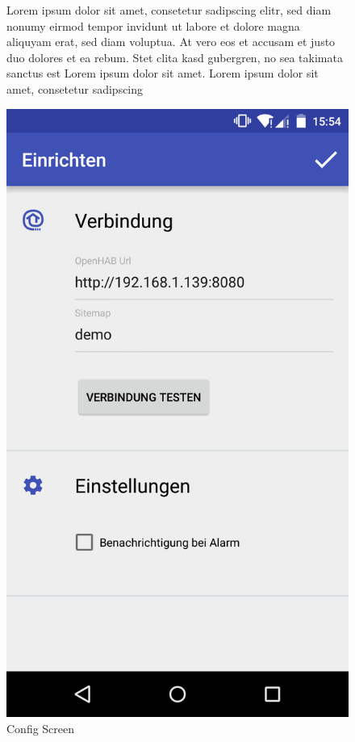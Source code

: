 \begin{figure}[htbp]
	\begin{minipage}{0.6\textwidth} 
Lorem ipsum dolor sit amet, consetetur sadipscing elitr, sed diam nonumy eirmod tempor invidunt ut labore et dolore magna aliquyam erat, sed diam voluptua. At vero eos et accusam et justo duo dolores et ea rebum. Stet clita kasd gubergren, no sea takimata sanctus est Lorem ipsum dolor sit amet. Lorem ipsum dolor sit amet, consetetur sadipscing 
	\end{minipage}
	\hfill
	\begin{minipage}{0.32\textwidth}
		\includegraphics[scale=0.12]{appendix/img/AppScreenshots/Screenshot2}
		\caption{Config Screen}
		\label{fig:screenshot_2}
	\end{minipage}
\end{figure}


